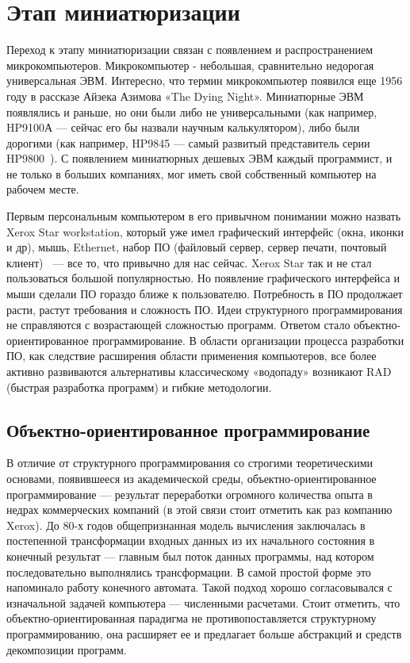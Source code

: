 \section{Этап миниатюризации}

Переход к этапу миниатюризации связан с появлением и распространением микрокомпьютеров. Микрокомпьютер - небольшая, сравнительно недорогая универсальная ЭВМ. Интересно, что термин микрокомпьютер появился еще 1956 году в рассказе Айзека Азимова «The Dying Night». Миниатюрные ЭВМ появлялись и раньше, но они были либо не универсальными (как например, HP9100А — сейчас его бы назвали научным калькулятором), либо были дорогими (как например, HP9845 — самый развитый представитель серии HP9800~\cite{HP9800}). С появлением миниатюрных дешевых ЭВМ каждый программист, и не только в больших компаниях, мог иметь свой собственный компьютер на рабочем месте.

Первым персональным компьютером в его привычном понимании можно назвать Xerox Star workstation, который уже имел графический интерфейс (окна, иконки и др), мышь, Ethernet, набор ПО (файловый сервер, сервер печати, почтовый клиент)~\cite{PCHIST} — все то, что привычно для нас сейчас. Xerox Star так и не стал пользоваться большой популярностью. Но появление графического интерфейса и мыши сделали ПО гораздо ближе к пользователю. Потребность в ПО продолжает расти, растут требования и сложность ПО. Идеи структурного программирования не справляются с возрастающей сложностью программ. Ответом стало объектно-ориентированное программирование. В области организации процесса разработки ПО, как следствие расширения области применения компьютеров, все более активно развиваются альтернативы классическому «водопаду» возникают RAD (быстрая разработка программ) и гибкие методологии.

\subsection{Объектно-ориентированное программирование}

В отличие от структурного программирования со строгими теоретическими основами, появившееся из академической среды, объектно-ориентированное программирование — результат переработки огромного количества опыта в недрах коммерческих компаний (в этой связи стоит отметить как раз компанию Xerox). До 80-х годов общепризнанная модель вычисления заключалась в постепенной трансформации входных данных из их начального состояния в конечный результат — главным был поток данных программы, над котором последовательно выполнялись трансформации. В самой простой форме это напоминало работу конечного автомата. Такой подход хорошо согласовывался с изначальной задачей компьютера — численными расчетами. Стоит отметить, что объектно-ориентированная парадигма не противопоставляется структурному программированию, она расширяет ее и предлагает больше абстракций и средств декомпозиции программ.

